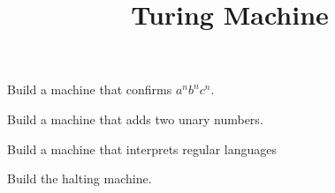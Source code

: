\documentclass{article}
\title{Turing Machine}
\begin{document}
	 Build a machine that confirms $a^nb^nc^n$.
		
		\bigskip
		\bigskip
		\bigskip
		\bigskip
		\bigskip
		\bigskip
	
	 Build a machine that adds two unary numbers.
	
		
		\bigskip
		\bigskip
		\bigskip
		\bigskip
		\bigskip
		\bigskip
		
	 Build a machine that interprets regular languages
	
		
		\bigskip
		\bigskip
		\bigskip
		\bigskip
		\bigskip
		\bigskip
		
			\bigskip
			\bigskip
			\bigskip
			\bigskip
			\bigskip
			\bigskip
			
		
	 Build the halting machine.
\end{document}
